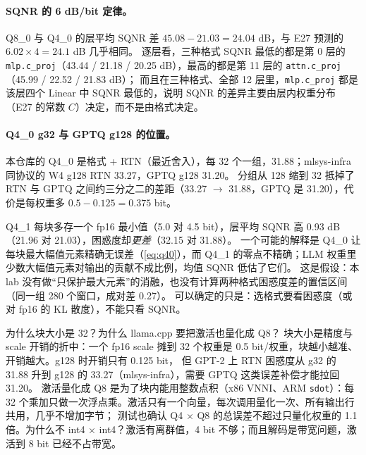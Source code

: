 \documentclass[11pt,a4paper]{ctexart}
\begin{document}
\paragraph{SQNR 的 6 dB/bit 定律。}Q8\_0 与 Q4\_0 的层平均 SQNR 差 $45.08 - 21.03 = 24.04$ dB，与 E27 预测的 $6.02 \times 4 = 24.1$ dB 几乎相同。
逐层看，三种格式 SQNR 最低的都是第 0 层的 \texttt{mlp.c\_proj}（43.44 / 21.18 / 20.25 dB），最高的都是第 11 层的 \texttt{attn.c\_proj}（45.99 / 22.52 / 21.83 dB）；
而且在三种格式、全部 12 层里，\texttt{mlp.c\_proj} 都是该层四个 Linear 中 SQNR 最低的，说明 SQNR 的差异主要由层内权重分布（E27 的常数 $C$）决定，而不是由格式决定。

\paragraph{Q4\_0 g32 与 GPTQ g128 的位置。}本仓库的 Q4\_0 是格式 + RTN（最近舍入），每 32 个一组，31.88；mlsys-infra 同协议的 W4 g128 RTN 33.27，GPTQ g128 31.20。
分组从 128 缩到 32 抵掉了 RTN 与 GPTQ 之间约三分之二的差距（33.27 $\to$ 31.88，GPTQ 是 31.20），代价是每权重多 $0.5 - 0.125 = 0.375$ bit。

\begin{findingbox}
Q4\_1 每块多存一个 fp16 最小值（5.0 对 4.5 bit），层平均 SQNR 高 0.93 dB（21.96 对 21.03），困惑度却\emph{更差}（32.15 对 31.88）。
一个可能的解释是 Q4\_0 让每块最大幅值元素精确无误差（\cref{eq:q40}），而 Q4\_1 的零点不精确；LLM 权重里少数大幅值元素对输出的贡献不成比例，均值 SQNR 低估了它们。
这是假设：本 lab 没有做“只保护最大元素”的消融，也没有计算两种格式困惑度差的置信区间（同一组 280 个窗口，成对差 0.27）。
可以确定的只是：选格式要看困惑度（或对 fp16 的 KL 散度），不能只看 SQNR。
\end{findingbox}

\begin{iqbox}{为什么块大小是 32？为什么 llama.cpp 要把激活也量化成 Q8？}
块大小是精度与 scale 开销的折中：一个 fp16 scale 摊到 32 个权重是 0.5 bit/权重，块越小越准、开销越大。g128 时开销只有 0.125 bit，
但 GPT-2 上 RTN 困惑度从 g32 的 31.88 升到 g128 的 33.27（mlsys-infra），需要 GPTQ 这类误差补偿才能拉回 31.20。
激活量化成 Q8 是为了块内能用整数点积（x86 VNNI、ARM \texttt{sdot}）：每 32 个乘加只做一次浮点乘。激活只有一个向量，每次调用量化一次、所有输出行共用，几乎不增加字节；
测试也确认 Q4 × Q8 的总误差不超过只量化权重的 1.1 倍。为什么不 int4 × int4？激活有离群值，4 bit 不够；而且解码是带宽问题，激活到 8 bit 已经不占带宽。
\end{iqbox}
\end{document}
